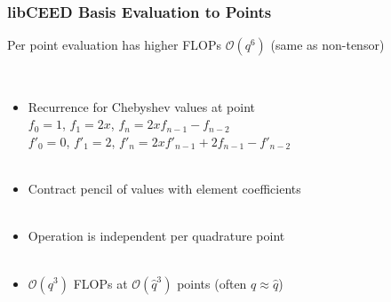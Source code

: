 \documentclass{beamer}
\begin{document}
\begin{frame}
\begin{center}
\frametitle{libCEED Basis Evaluation to Points}

Per point evaluation has higher FLOPs $\mathcal{O} \left( q^6 \right)$ (same as non-tensor)

~\\

\begin{itemize}

\item Recurrence for Chebyshev values at point\\

$f_0 = 1$, $f_1 = 2 x$, $f_n = 2 x f_{n - 1} - f_{n - 2}$\\

$f'_0 = 0$, $f'_1 = 2$, \hspace{0.7mm} $f'_n = 2 x f'_{n - 1} + 2 f_{n - 1} - f'_{n - 2}$\\

~\\

\item Contract pencil of values with element coefficients\\

~\\

\item Operation is independent per quadrature point\\

~\\

\item $\mathcal{O} \left( q^3 \right)$ FLOPs at $\mathcal{O} \left( \hat{q}^3 \right)$ points (often $q \approx \hat{q}$)\\

\end{itemize}

\end{center}
\end{frame}

\end{document}
